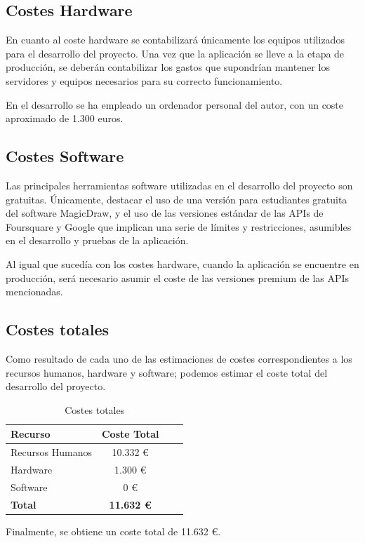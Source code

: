 \subsection{Costes Hardware}
En cuanto al coste hardware se contabilizará únicamente los equipos utilizados para el desarrollo del proyecto. Una vez que la aplicación se lleve a la etapa de producción, se deberán contabilizar los gastos que supondrían mantener los servidores y equipos necesarios para su correcto funcionamiento.

En el desarrollo se ha empleado un ordenador personal del autor, con un coste aproximado de 1.300 euros.


\subsection{Costes Software}
Las principales herramientas software utilizadas en el desarrollo del proyecto son gratuitas. Únicamente, destacar el uso de una versión para estudiantes gratuita del software MagicDraw, y el uso de las versiones estándar de las APIs de Foursquare y Google que implican una serie de límites y restricciones, asumibles en el desarrollo y pruebas de la aplicación. 

Al igual que sucedía con los costes hardware, cuando la aplicación se encuentre en producción, será necesario asumir el coste de las versiones premium de las APIs mencionadas.


\subsection{Costes totales}
Como resultado de cada uno de las estimaciones de costes correspondientes a los recursos humanos, hardware y software; podemos estimar el coste total del desarrollo del proyecto.

\begin{table}[H]
\centering
\begin{tabular}{|l|c|c|c|}
\hline
\textbf{Recurso} & \textbf{Coste Total} \\ \hline
Recursos Humanos &  10.332 € \\ \hline
Hardware & 1.300 €  \\ \hline
Software & 0 €  \\ \hline
\textbf{Total} & \textbf{11.632 €} \\ \hline
\end{tabular}
\caption{Costes totales}
\end{table}

Finalmente, se obtiene un coste total de 11.632 €.
